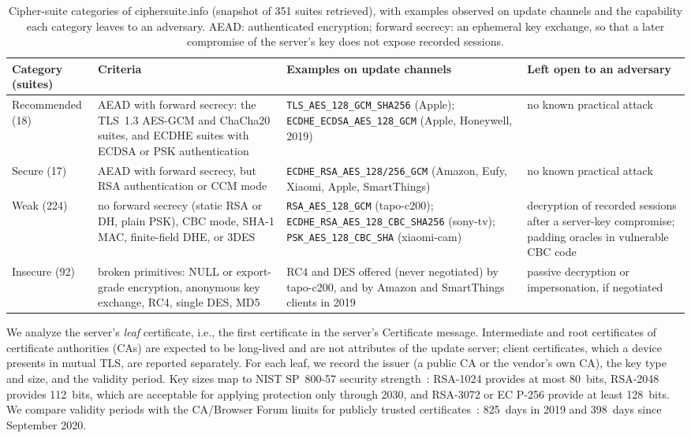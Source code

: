 \begin{table}[!t]
    \centering
    \caption{Cipher-suite categories of ciphersuite.info (snapshot of 351 suites retrieved), with examples observed on update channels and the capability each category leaves to an adversary. AEAD: authenticated encryption; forward secrecy: an ephemeral key exchange, so that a later compromise of the server's key does not expose recorded sessions.}
    \label{tab:cipher_classes}
    \setlength{\tabcolsep}{4pt}
    \footnotesize
    \begin{tabular}{@{} l >{\raggedright\arraybackslash}p{5.3cm} >{\raggedright\arraybackslash}p{5.3cm} >{\raggedright\arraybackslash}p{4.1cm} @{}}
        \toprule
        \textbf{Category (suites)} & \textbf{Criteria} & \textbf{Examples on update channels} & \textbf{Left open to an adversary} \\
        \midrule
        Recommended (18) & AEAD with forward secrecy: the TLS~1.3 AES-GCM and ChaCha20 suites, and ECDHE suites with ECDSA or PSK authentication & \texttt{TLS\_AES\_128\_GCM\_SHA256} (Apple); \texttt{ECDHE\_ECDSA\_AES\_128\_GCM} (Apple, Honeywell, 2019) & no known practical attack \\
        \addlinespace
        Secure (17) & AEAD with forward secrecy, but RSA authentication or CCM mode & \texttt{ECDHE\_RSA\_AES\_128/256\_GCM} (Amazon, Eufy, Xiaomi, Apple, SmartThings) & no known practical attack \\
        \addlinespace
        Weak (224) & no forward secrecy (static RSA or DH, plain PSK), CBC mode, SHA-1 MAC, finite-field DHE, or 3DES & \texttt{RSA\_AES\_128\_GCM} (tapo-c200); \texttt{ECDHE\_RSA\_AES\_128\_CBC\_SHA256} (sony-tv); \texttt{PSK\_AES\_128\_CBC\_SHA} (xiaomi-cam) & decryption of recorded sessions after a server-key compromise; padding oracles in vulnerable CBC code \\
        \addlinespace
        Insecure (92) & broken primitives: NULL or export-grade encryption, anonymous key exchange, RC4, single DES, MD5 & RC4 and DES offered (never negotiated) by tapo-c200, and by Amazon and SmartThings clients in 2019 & passive decryption or impersonation, if negotiated \\
        \bottomrule
    \end{tabular}
\end{table}

We analyze the server's \emph{leaf} certificate, i.e., the first certificate in the server's Certificate message.
Intermediate and root certificates of certificate authorities (CAs) are expected to be long-lived and are not attributes of the update server; client certificates, which a device presents in mutual TLS, are reported separately.
For each leaf, we record the issuer (a public CA or the vendor's own CA), the key type and size, and the validity period.
Key sizes map to NIST SP~800-57 security strength~\cite{NIST2020-SP800-57}: RSA-1024 provides at most 80~bits, RSA-2048 provides 112~bits, which are acceptable for applying protection only through 2030, and RSA-3072 or EC P-256 provide at least 128~bits.
We compare validity periods with the CA/Browser Forum limits for publicly trusted certificates~\cite{cabf-br}: 825~days in 2019 and 398~days since September 2020.

